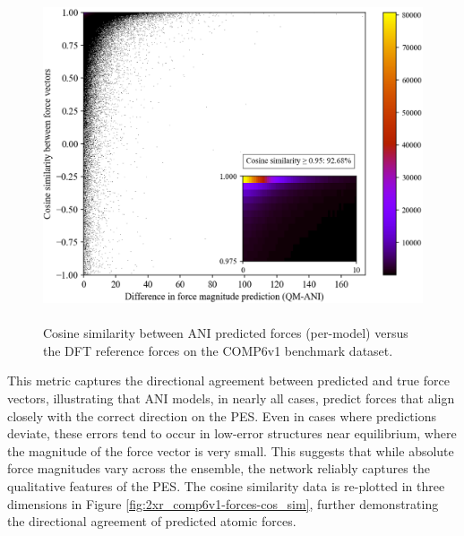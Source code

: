 \begin{figure}[H]
    \centering
    \includegraphics[width=1\linewidth]{Images/2xr_forces/cos_sim-hist2d-insert.png}
    \caption[2D histogram of cosine similarity measure of predicted atomic force vectors]{  \\
    Cosine similarity between ANI predicted forces (per-model) versus the DFT reference forces on the COMP6v1 benchmark dataset.
    }
    \label{fig:2d_2xr_comp6v1-forces-cos_sim}
\end{figure}

This metric captures the directional agreement between predicted and true force vectors, illustrating that ANI models, in nearly all cases, predict forces that align closely with the correct direction on the PES. 
Even in cases where predictions deviate, these errors tend to occur in low-error structures near equilibrium, where the magnitude of the force vector is very small. 
This suggests that while absolute force magnitudes vary across the ensemble, the network reliably captures the qualitative features of the PES.
The cosine similarity data is re-plotted in three dimensions in Figure \ref{fig:2xr_comp6v1-forces-cos_sim}, further demonstrating the directional agreement of predicted atomic forces.


